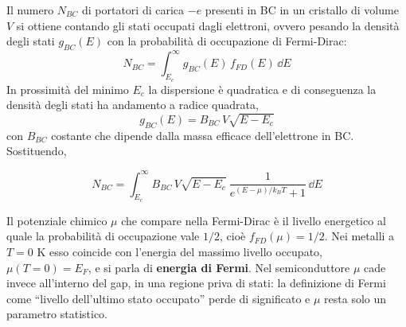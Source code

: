 Il numero \( N_{BC} \) di portatori di carica \( -e \) presenti in BC in un cristallo di volume \( V \) si ottiene contando gli stati occupati dagli elettroni, ovvero pesando la densità degli stati \( g_{BC}(E) \) con la probabilità di occupazione di Fermi-Dirac:
\begin{equation}
    N_{BC} = \int_{E_c}^{\infty} g_{BC}(E) \, f_{FD}(E) \, \dd E
\end{equation}
In prossimità del minimo \( E_c \) la dispersione è quadratica e di conseguenza la densità degli stati ha andamento a radice quadrata,
\begin{equation}
    g_{BC}(E) = B_{BC} \, V \sqrt{E - E_c}
\end{equation}
con \( B_{BC} \) costante che dipende dalla massa efficace dell'elettrone in BC. Sostituendo,
\begin{importantbox}
    \begin{equation}
        N_{BC} = \int_{E_c}^{\infty} B_{BC} \, V \sqrt{E - E_c} \ \frac{1}{\displaystyle e^{(E - \mu)/k_B T} + 1} \, \dd E
    \end{equation}
\end{importantbox}

Il potenziale chimico \( \mu \) che compare nella Fermi-Dirac è il livello energetico al quale la probabilità di occupazione vale \( 1/2 \), cioè \( f_{FD}(\mu) = 1/2 \). Nei metalli a \( T = 0 \) K esso coincide con l'energia del massimo livello occupato, \( \mu(T = 0) = E_F \), e si parla di \textbf{energia di Fermi}. Nel semiconduttore \( \mu \) cade invece all'interno del gap, in una regione priva di stati: la definizione di Fermi come ``livello dell'ultimo stato occupato'' perde di significato e \( \mu \) resta solo un parametro statistico.

